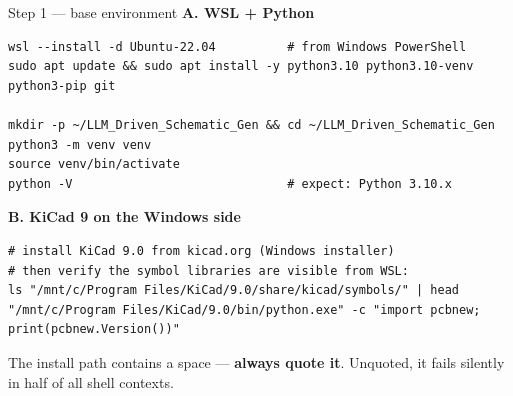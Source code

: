 \documentclass[aspectratio=169,10pt]{beamer}
\begin{document}
\begin{frame}[fragile]{Step 1 --- base environment}
\vspace{1mm}
\textbf{A. WSL + Python}
\begin{lstlisting}
wsl --install -d Ubuntu-22.04          # from Windows PowerShell
sudo apt update && sudo apt install -y python3.10 python3.10-venv python3-pip git

mkdir -p ~/LLM_Driven_Schematic_Gen && cd ~/LLM_Driven_Schematic_Gen
python3 -m venv venv
source venv/bin/activate
python -V                              # expect: Python 3.10.x
\end{lstlisting}
\vspace{1mm}
\textbf{B. KiCad 9 on the Windows side}
\begin{lstlisting}
# install KiCad 9.0 from kicad.org (Windows installer)
# then verify the symbol libraries are visible from WSL:
ls "/mnt/c/Program Files/KiCad/9.0/share/kicad/symbols/" | head
"/mnt/c/Program Files/KiCad/9.0/bin/python.exe" -c "import pcbnew; print(pcbnew.Version())"
\end{lstlisting}
\vspace{1mm}
\begin{center}\footnotesize\color{stred}
The install path contains a space --- \textbf{always quote it}. Unquoted, it fails silently in half of all shell contexts.
\end{center}
\end{frame}
\end{document}
